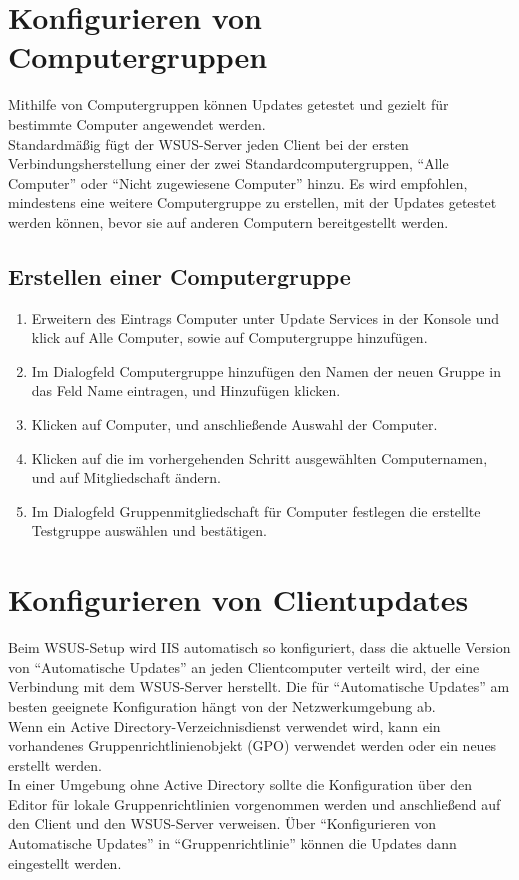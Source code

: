 \documentclass{preset/school}
\begin{document}
\section{Konfigurieren von Computergruppen}
Mithilfe von Computergruppen können Updates getestet und gezielt für bestimmte Computer angewendet werden.
\\\vspace{0.5 em}
Standardmäßig fügt der WSUS-Server jeden Client bei der ersten Verbindungsherstellung einer der zwei Standardcomputergruppen, ``Alle Computer'' oder ``Nicht zugewiesene Computer'' hinzu.
Es wird empfohlen, mindestens eine weitere Computergruppe zu erstellen, mit der Updates getestet werden können, bevor sie auf anderen Computern bereitgestellt werden.

\subsection{Erstellen einer Computergruppe}
\begin{enumerate}
    \item Erweitern des Eintrags Computer unter Update Services in der Konsole und klick auf Alle Computer, sowie auf Computergruppe hinzufügen.
    \item Im Dialogfeld Computergruppe hinzufügen den Namen der neuen Gruppe in das Feld Name eintragen, und Hinzufügen klicken.
    \item Klicken auf Computer, und anschließende Auswahl der Computer.
    \item Klicken auf die im vorhergehenden Schritt ausgewählten Computernamen, und auf Mitgliedschaft ändern.
    \item Im Dialogfeld Gruppenmitgliedschaft für Computer festlegen die erstellte Testgruppe auswählen und bestätigen.
\end{enumerate}

\newpage
\section{Konfigurieren von Clientupdates}
Beim WSUS-Setup wird IIS automatisch so konfiguriert, dass die aktuelle Version von ``Automatische Updates'' an jeden Clientcomputer verteilt wird, der eine Verbindung mit dem WSUS-Server herstellt.
Die für ``Automatische Updates'' am besten geeignete Konfiguration hängt von der Netzwerkumgebung ab.
\\\vspace{0.5 em}
Wenn ein Active Directory-Verzeichnisdienst verwendet wird, kann ein vorhandenes Gruppenrichtlinienobjekt (GPO) verwendet werden oder ein neues erstellt werden.
\\\vspace{0.5 em}
In einer Umgebung ohne Active Directory sollte die Konfiguration über den Editor für lokale Gruppenrichtlinien vorgenommen werden und anschließend auf den Client und den WSUS-Server verweisen.
Über ``Konfigurieren von Automatische Updates'' in ``Gruppenrichtlinie'' können die Updates dann eingestellt werden.
\end{document}
